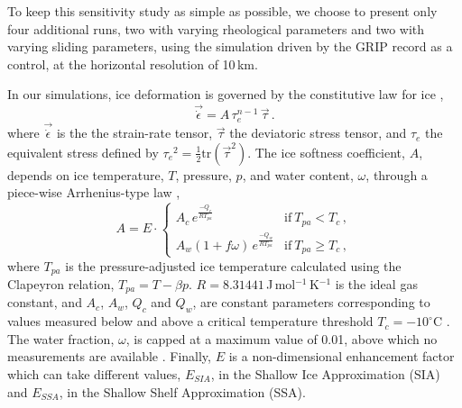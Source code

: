 To keep this sensitivity study as simple as possible, we choose to present only
four additional runs, two with varying rheological parameters and two with
varying sliding parameters, using the simulation driven by the GRIP record as
a control, at the horizontal resolution of 10\,km.

In our simulations, ice deformation is governed by the constitutive law for ice
\citep{Glen.1952, Nye.1953},
%
\begin{equation}
    \label{eqn:glenslaw}
    \vec{\dot{\epsilon}} = A\,\tau_e^{n-1}\,\vec{\tau} \,.
\end{equation}
%
where $\vec{\dot{\epsilon}}$ is the the strain-rate tensor, $\vec{\tau}$ the
deviatoric stress tensor, and $\tau_e$ the equivalent stress defined by
${\tau_e}^2 = \frac{1}{2} \mathrm{tr}(\vec{\tau}^2)$.
The ice softness coefficient, $A$, depends on ice temperature, $T$, pressure, $p$, and
water content, $\omega$, through a piece-wise Arrhenius-type law
\citep[Eqs.~63--65]{Aschwanden.etal.2012},
%
\begin{equation}
    \label{eqn:softness}
    A = E\cdot
    \left\{\begin{array}{ll}
        A_c \,e^\frac{-Q_c}{RT_{pa}}
            & \mathrm{if}\ T_{pa} < T_c \,, \\
        A_w (1+f\omega)\,e^\frac{-Q_w}{RT_{pa}}
            & \mathrm{if}\ T_{pa} \ge T_c \,,
    \end{array}\right.
\end{equation}
%
where $T_{pa}$ is the pressure-adjusted ice temperature calculated using the
Clapeyron relation, ${T_{pa} = T - \beta p}$.
$R=8.31441$\,J\,mol$^{-1}$\,K$^{-1}$ is the ideal gas constant, and $A_c$,
$A_w$, $Q_c$ and $Q_w$, are constant parameters corresponding to values
measured below and above a critical temperature threshold ${T_c=-10}^\circ$C
\citep[p.~72]{Paterson.Budd.1982,Cuffey.Paterson.2010}. The water fraction,
$\omega$, is capped at a maximum value of 0.01, above which no measurements
are available \citep[Eq.~5.7]{Lliboutry.Duval.1985, Greve.1997}. Finally,
$E$ is a non-dimensional enhancement factor which can take different values,
$E_{SIA}$, in the Shallow Ice Approximation (SIA) and $E_{SSA}$, in the Shallow
Shelf Approximation (SSA).

